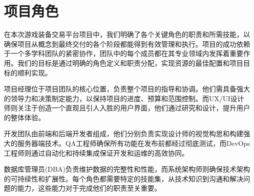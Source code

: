 \documentclass{ctexart}
\begin{document}
\section{项目角色}
在本次游戏装备交易平台项目中，我们明确了各个关键角色的职责和所需技能，以确保项目从概念到最终交付的各个阶段都能得到有效管理和执行。项目的成功依赖于一个多学科团队的紧密协作，团队中的每个成员都在其专业领域内发挥着重要作用。我们的目标是通过明确的角色定义和职责分配，实现资源的最佳配置和项目目标的顺利实现。

项目经理位于项目团队的核心位置，负责整个项目的指导和协调。他们需具备强大的领导力和决策制定能力，以保持项目的进度、预算和范围控制。而UX/UI设计师则关注于创造一个直观且引人入胜的用户界面，他们通过研究和设计，提升用户的整体体验。

开发团队由前端和后端开发者组成，他们分别负责实现设计师的视觉构思和构建强大的服务器端技术。QA工程师确保所有功能在发布前都经过彻底测试，而DevOps工程师则通过自动化和持续集成保证开发和运维的高效协同。

数据库管理员(DBA)负责维护数据的完整性和性能，而系统架构师则确保技术架构的可持续性和扩展性。每个角色都需要特定的技能集，从技术知识到沟通和解决问题的能力，这些能力对于完成他们的职责至关重要。
\end{document}

